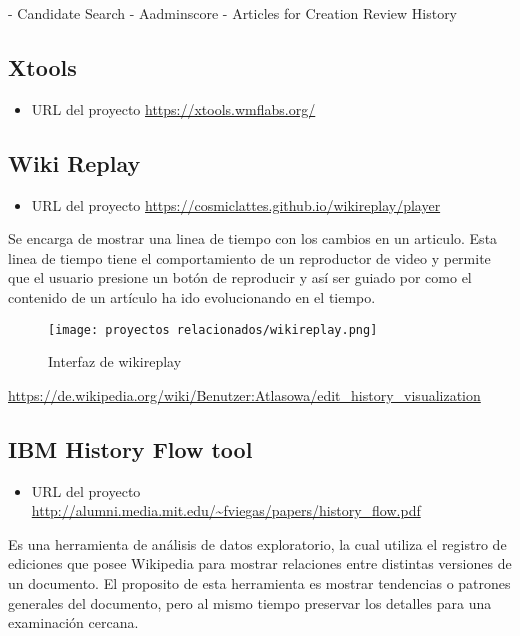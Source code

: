 - Candidate Search
- Aadminscore
- Articles for Creation Review History

\subsection{Xtools}
\begin{itemize}
    \item URL del proyecto \url{https://xtools.wmflabs.org/}
\end{itemize}

\subsection{Wiki Replay}
\begin{itemize}
    \item URL del proyecto \url{https://cosmiclattes.github.io/wikireplay/player}
\end{itemize}

Se encarga de mostrar una linea de tiempo con los cambios en un articulo. Esta linea de tiempo
tiene el comportamiento de un reproductor de video y permite que el usuario presione un botón de
reproducir y así ser guiado por como el contenido de un artículo ha ido evolucionando en el tiempo.

\begin{figure}[H]
    \centering
    \texttt{[image: proyectos relacionados/wikireplay.png]}
    \caption{Interfaz de wikireplay}
    \label{wikireplay}
\end{figure}


\url{https://de.wikipedia.org/wiki/Benutzer:Atlasowa/edit_history_visualization}

\subsection{IBM History Flow tool}

\begin{itemize}
    \item URL del proyecto \url{http://alumni.media.mit.edu/~fviegas/papers/history_flow.pdf}
\end{itemize}

Es una herramienta de análisis de datos exploratorio, la cual utiliza el registro de ediciones que posee Wikipedia para mostrar relaciones entre distintas versiones de un documento. El proposito de esta herramienta es mostrar tendencias o patrones generales del documento, pero al mismo tiempo preservar los detalles para una examinación cercana.

